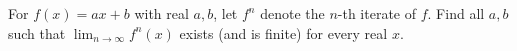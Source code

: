 For $f(x)=ax+b$ with real $a,b$, let $f^n$ denote the $n$-th iterate of $f$. Find all $a,b$ such that $\displaystyle\lim_{n\to\infty}f^n(x)$ exists (and is finite) for every real $x$.
